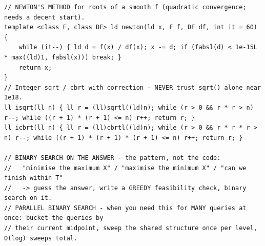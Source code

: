 \documentclass[9pt,a4paper,twocolumn]{extarticle}
\begin{document}
\begin{lstlisting}
// NEWTON'S METHOD for roots of a smooth f (quadratic convergence; needs a decent start).
template <class F, class DF> ld newton(ld x, F f, DF df, int it = 60) {
    while (it--) { ld d = f(x) / df(x); x -= d; if (fabsl(d) < 1e-15L * max((ld)1, fabsl(x))) break; }
    return x;
}
// Integer sqrt / cbrt with correction - NEVER trust sqrt() alone near 1e18.
ll isqrt(ll n) { ll r = (ll)sqrtl((ld)n); while (r > 0 && r * r > n) r--; while ((r + 1) * (r + 1) <= n) r++; return r; }
ll icbrt(ll n) { ll r = (ll)cbrtl((ld)n); while (r > 0 && r * r * r > n) r--; while ((r + 1) * (r + 1) * (r + 1) <= n) r++; return r; }

// BINARY SEARCH ON THE ANSWER - the pattern, not the code:
//   "minimise the maximum X" / "maximise the minimum X" / "can we finish within T"
//   -> guess the answer, write a GREEDY feasibility check, binary search on it.
// PARALLEL BINARY SEARCH - when you need this for MANY queries at once: bucket the queries by
// their current midpoint, sweep the shared structure once per level, O(log) sweeps total.
\end{lstlisting}

\filbreak
\end{document}
